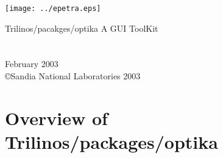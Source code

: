 \documentclass[letterpaper]{book}
\begin{document}
\begin{titlepage}
\texttt{[image: ../epetra.eps]}
\begin{center}
{\Huge Trilinos/pacakges/optika A GUI ToolKit\\[1ex]\large }\\
\vspace*{1cm}\\
\vspace*{0.5cm}
{\small February 2003}\\
\copyright Sandia National Laboratories 2003
\end{center}
\end{titlepage}
\clearemptydoublepage
{}
\tableofcontents
\clearemptydoublepage
{}
\chapter{Overview of Trilinos/packages/optika}

\end{document}
